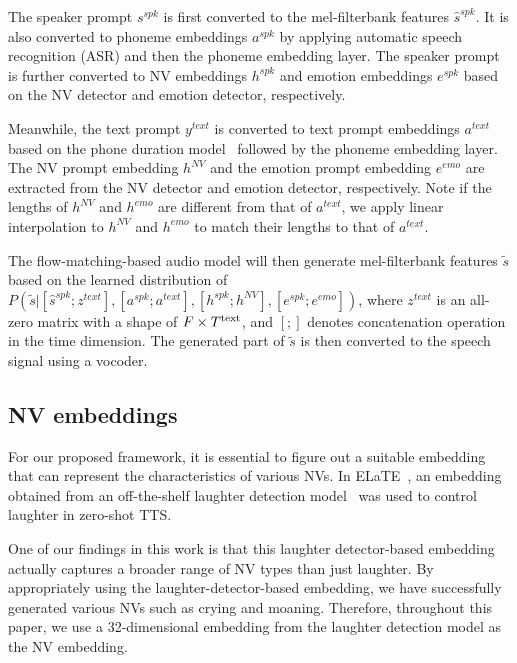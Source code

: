 The speaker prompt $s^{spk}$ is first converted to the mel-filterbank features $\hat{s}^{spk}$. It is also converted to phoneme embeddings $a^{spk}$ by applying automatic speech recognition (ASR) and then the phoneme embedding layer. The speaker prompt is further converted to NV embeddings $h^{spk}$ and emotion embeddings $e^{spk}$ based on the NV detector and emotion detector, respectively.

Meanwhile, the text prompt $y^{text}$ is converted to text prompt embeddings $a^{text}$ based on the phone duration model~\cite{le2024voicebox} followed by the phoneme embedding layer. The NV prompt embedding $h^{NV}$ and the emotion prompt embedding $e^{emo}$ are extracted from the NV detector and emotion detector, respectively. 
Note if the lengths of $h^{NV}$ and $h^{emo}$ are different from that of $a^{text}$, we apply linear interpolation to $h^{NV}$ and $h^{emo}$ to match their lengths to that of $a^{text}$.

The flow-matching-based audio model will then generate mel-filterbank features $\tilde{s}$ based on the learned distribution of $P(\tilde{s}|[\hat{s}^{spk}; z^{text}], [a^{spk}; a^{text}], [h^{spk}; h^{NV}], [e^{spk}; e^{emo}])$, where $z^{text}$ 
is an all-zero matrix with a shape of ${F\times T^{\rm text}}$,
and $[;]$ denotes concatenation operation in the time dimension. The generated part of $\tilde{s}$ is then converted to the speech signal using a vocoder.


\vspace{-.5em}
\subsection{NV embeddings}
\label{ssec:nv_feature}

For our proposed framework, it is essential to figure out a suitable embedding that can represent the characteristics of various NVs. In ELaTE~\cite{kanda2024making}, an embedding obtained from an off-the-shelf laughter detection model~\cite{ryokai2018capturing, gillick2021robust} was used to control laughter in zero-shot TTS.

One of our findings in this work is that this laughter detector-based embedding actually captures a broader range of NV types than just laughter. By appropriately using the laughter-detector-based embedding, we have successfully generated various NVs such as crying and moaning.
Therefore, throughout this paper, we use a 32-dimensional embedding from the laughter detection model as the NV embedding.



